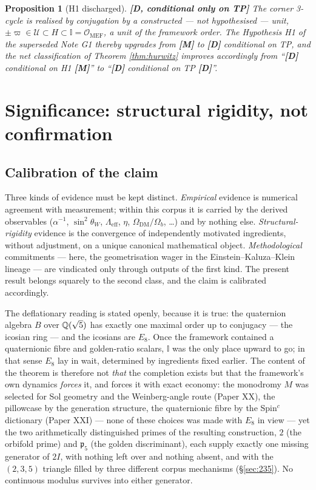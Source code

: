 \documentclass[11pt,a4paper]{article}
\theoremstyle{plain}
\newtheorem{proposition}{Proposition}
\theoremstyle{definition}
\theoremstyle{remark}
\newcommand{\Ico}{\mathbb{I}}
\newcommand{\Uset}{\mathcal{U}}
\newcommand{\pfive}{\mathfrak{p}_5}
\newcommand{\OrderMEF}{\mathcal{O}_{\mathrm{MEF}}}
\newcommand{\rtag}[1]{\textnormal{\textbf{[#1]}}}
\begin{document}
\begin{proposition}[H1 discharged]\label{prop:h1}
\rtag{D, conditional only on TP} The corner 3-cycle is realised by conjugation by a constructed --- not hypothesised --- unit, $\pm\varpi \in \Uset \subset H \subset \Ico = \OrderMEF$, a unit of the framework order. The Hypothesis H1 of the superseded Note G1 thereby upgrades from \rtag{M} to \rtag{D} conditional on TP, and the net classification of Theorem \ref{thm:hurwitz} improves accordingly from ``\rtag{D} conditional on H1 \rtag{M}'' to ``\rtag{D} conditional on TP \rtag{D}''.
\end{proposition}

\section{Significance: structural rigidity, not confirmation}\label{sec:significance}

\subsection{Calibration of the claim}\label{sec:calibration}

Three kinds of evidence must be kept distinct. \emph{Empirical} evidence is numerical agreement with measurement; within this corpus it is carried by the derived observables ($\alpha^{-1}$, $\sin^2\theta_W$, $\Lambda_{\mathrm{eff}}$, $\eta$, $\Omega_{\mathrm{DM}}/\Omega_b$, \dots) and by nothing else. \emph{Structural-rigidity} evidence is the convergence of independently motivated ingredients, without adjustment, on a unique canonical mathematical object. \emph{Methodological} commitments --- here, the geometrisation wager in the Einstein--Kaluza--Klein lineage --- are vindicated only through outputs of the first kind. The present result belongs squarely to the second class, and the claim is calibrated accordingly.

The deflationary reading is stated openly, because it is true: the quaternion algebra $B$ over $\mathbb{Q}(\sqrt5)$ has exactly one maximal order up to conjugacy --- the icosian ring --- and the icosians are $E_8$. Once the framework contained a quaternionic fibre and golden-ratio scalars, $\Ico$ was the only place upward to go; in that sense $E_8$ lay in wait, determined by ingredients fixed earlier. The content of the theorem is therefore not \emph{that} the completion exists but that the framework's own dynamics \emph{forces} it, and forces it with exact economy: the monodromy $M$ was selected for Sol geometry and the Weinberg-angle route (Paper XX), the pillowcase by the generation structure, the quaternionic fibre by the Spin$^c$ dictionary (Paper XXI) --- none of these choices was made with $E_8$ in view --- yet the two arithmetically distinguished primes of the resulting construction, $2$ (the orbifold prime) and $\pfive$ (the golden discriminant), each supply exactly one missing generator of $2I$, with nothing left over and nothing absent, and with the $(2,3,5)$ triangle filled by three different corpus mechanisms (\S\ref{sec:235}). No continuous modulus survives into either generator.
\end{document}
